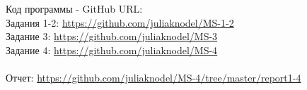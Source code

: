 Код программы - GitHub URL:  \\
Задания 1-2: \url{https://github.com/juliaknodel/MS-1-2} \\
Задание 3: \url{https://github.com/juliaknodel/MS-3} \\
Задание 4: \url{https://github.com/juliaknodel/MS-4} \\
\\
Отчет: \url{https://github.com/juliaknodel/MS-4/tree/master/report1-4}